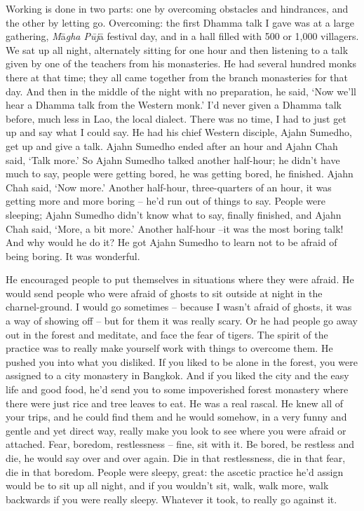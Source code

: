 Working is done in two parts: one by overcoming obstacles and
hindrances, and the other by letting go. Overcoming: the first Dhamma
talk I gave was at a large gathering, \emph{M}ā\emph{gha Pūj}ā festival
day, and in a hall filled with 500 or 1,000 villagers. We sat up all
night, alternately sitting for one hour and then listening to a talk
given by one of the teachers from his monasteries. He had several
hundred monks there at that time; they all came together from the branch
monasteries for that day. And then in the middle of the night with no
preparation, he said, `Now we'll hear a Dhamma talk from the Western
monk.' I'd never given a Dhamma talk before, much less in Lao, the local
dialect. There was no time, I had to just get up and say what I could
say. He had his chief Western disciple, Ajahn Sumedho, get up and give a
talk. Ajahn Sumedho ended after an hour and Ajahn Chah said, `Talk
more.' So Ajahn Sumedho talked another half-hour; he didn't have much to
say, people were getting bored, he was getting bored, he finished. Ajahn
Chah said, `Now more.' Another half-hour, three-quarters of an hour, it
was getting more and more boring -- he'd run out of things to say.
People were sleeping; Ajahn Sumedho didn't know what to say, finally
finished, and Ajahn Chah said, `More, a bit more.' Another half-hour
--it was the most boring talk! And why would he do it? He got Ajahn
Sumedho to learn not to be afraid of being boring. It was wonderful.

He encouraged people to put themselves in situations where they were
afraid. He would send people who were afraid of ghosts to sit outside at
night in the charnel-ground. I would go sometimes -- because I wasn't
afraid of ghosts, it was a way of showing off -- but for them it was
really scary. Or he had people go away out in the forest and meditate,
and face the fear of tigers. The spirit of the practice was to really
make yourself work with things to overcome them. He pushed you into what
you disliked. If you liked to be alone in the forest, you were assigned
to a city monastery in Bangkok. And if you liked the city and the easy
life and good food, he'd send you to some impoverished forest monastery
where there were just rice and tree leaves to eat. He was a real rascal.
He knew all of your trips, and he could find them and he would somehow,
in a very funny and gentle and yet direct way, really make you look to
see where you were afraid or attached. Fear, boredom, restlessness --
fine, sit with it. Be bored, be restless and die, he would say over and
over again. Die in that restlessness, die in that fear, die in that
boredom. People were sleepy, great: the ascetic practice he'd assign
would be to sit up all night, and if you wouldn't sit, walk, walk more,
walk backwards if you were really sleepy. Whatever it took, to really go
against it.

